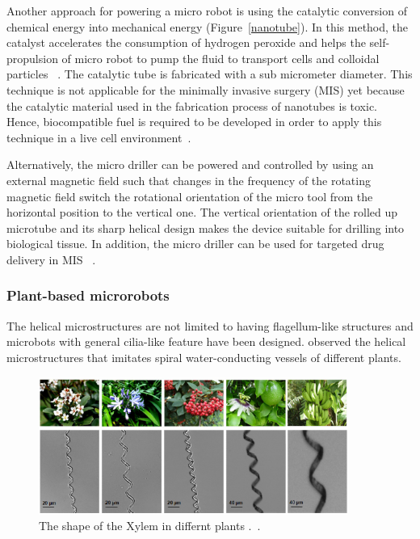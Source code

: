 \documentclass[12pt,a4paper,titlepage]{report}
\newcommand{\hilight}[1]{\colorbox{yellow}{#1}}
\begin{document}
Another approach for powering a micro robot is using the catalytic conversion of chemical energy
 into mechanical energy (Figure~\ref{nanotube}). In this method, the catalyst accelerates the consumption of hydrogen peroxide
 and helps the self-propulsion of micro robot to pump the fluid to transport cells and colloidal 
particles ~\citep{C2NR32798H}. The catalytic tube is fabricated with a sub micrometer diameter.
 This technique is not applicable for the minimally invasive surgery (MIS) yet because the catalytic
 material used in the fabrication process of nanotubes is toxic. Hence, biocompatible fuel is required to be developed in order to 
apply this technique in a live cell environment~\citep{C2NR32798H}.




Alternatively, the micro driller can be powered and controlled by using an external magnetic field 
such that changes in the frequency of the rotating magnetic field switch the rotational orientation of the 
micro tool from the horizontal position to the vertical one. The vertical orientation of the rolled up microtube 
and its sharp helical design makes the device suitable for drilling into biological tissue. In addition, the micro 
driller can be used for targeted drug delivery in MIS ~\citep{C2NR32798H}. 


\subsubsection{Plant-based microrobots}
The helical microstructures are not limited to having flagellum-like structures and microbots with
general cilia-like feature have been designed. \citeauthor{gao2013bioinspired}
 observed the helical microstructures that imitates spiral water-conducting vessels of different plants. 

\begin{figure}
  \centering
    \includegraphics[width=0.9\textwidth]{plants}
  \caption{The shape of the Xylem in differnt plants .~\citep{mahoney2011velocity}.}
  \label{plants}
\end{figure}
\end{document}

